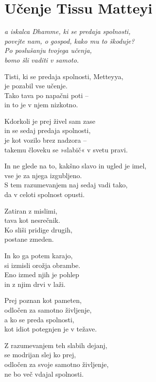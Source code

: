 \cleartorecto
{}
\chapter{Učenje Tissu Matteyi}

\emph{a iskalca Dhamme, ki se predaja spolnosti,\\
povejte nam, o gospod, kako mu to škoduje?\\
Po poslušanju tvojega učenja,\\
bomo šli vaditi v samoto.}

Tisti, ki se predaja spolnosti, Metteyya,\\
je pozabil vse učenje.\\
Tako tava po napačni poti --\\
in to je v njem nizkotno.

Kdorkoli je prej živel sam zase\\
in se sedaj predaja spolnosti,\\
je kot vozilo brez nadzora --\\
takemu človeku se »slabič« v svetu pravi.

In ne glede na to, kakšno slavo in ugled je imel,\\
vse je za njega izgubljeno.\\
S tem razumevanjem naj sedaj vadi tako,\\
da v celoti spolnost opusti.

\clearpage

Zatiran z mislimi,\\
tava kot nesrečnik.\\
Ko sliši pridige drugih,\\
postane zmeden.

In ko ga potem karajo,\\
si izmisli orožja obrambe.\\
Eno izmed njih je pohlep\\
in z njim drvi v laži.

Prej poznan kot pameten,\\
odločen za samotno življenje,\\
a ko se preda spolnosti,\\
kot idiot potegnjen je v težave.

Z razumevanjem teh slabih dejanj,\\
se modrijan slej ko prej,\\
odločen za svoje samotno življenje,\\
ne bo več vdajal spolnosti.

